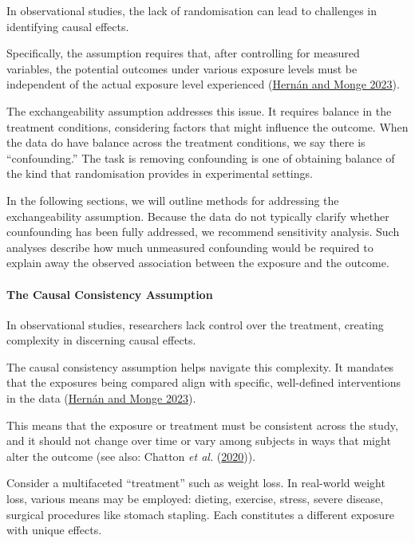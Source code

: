 \documentclass[
  singlecolumn]{article}
\let\oldparagraph\paragraph
\renewcommand{\paragraph}[1]{\oldparagraph{#1}\mbox{}}
\begin{document}
In observational studies, the lack of randomisation can lead to
challenges in identifying causal effects.

Specifically, the assumption requires that, after controlling for
measured variables, the potential outcomes under various exposure levels
must be independent of the actual exposure level experienced
(\protect\hyperlink{ref-hernuxe1n2023}{Hernán and Monge 2023}).

The exchangeability assumption addresses this issue. It requires balance
in the treatment conditions, considering factors that might influence
the outcome. When the data do have balance across the treatment
conditions, we say there is ``confounding.'' The task is removing
confounding is one of obtaining balance of the kind that randomisation
provides in experimental settings.

In the following sections, we will outline methods for addressing the
exchangeability assumption. Because the data do not typically clarify
whether counfounding has been fully addressed, we recommend sensitivity
analysis. Such analyses describe how much unmeasured confounding would
be required to explain away the observed association between the
exposure and the outcome.

\hypertarget{the-causal-consistency-assumption}{%
\paragraph{\texorpdfstring{\textbf{The Causal Consistency
Assumption}}{The Causal Consistency Assumption}}\label{the-causal-consistency-assumption}}

In observational studies, researchers lack control over the treatment,
creating complexity in discerning causal effects.

The causal consistency assumption helps navigate this complexity. It
mandates that the exposures being compared align with specific,
well-defined interventions in the data
(\protect\hyperlink{ref-hernuxe1n2023}{Hernán and Monge 2023}).

This means that the exposure or treatment must be consistent across the
study, and it should not change over time or vary among subjects in ways
that might alter the outcome (see also: Chatton \emph{et al.}
(\protect\hyperlink{ref-chatton2020}{2020})).

Consider a multifaceted ``treatment'' such as weight loss. In real-world
weight loss, various means may be employed: dieting, exercise, stress,
severe disease, surgical procedures like stomach stapling. Each
constitutes a different exposure with unique effects.
\end{document}
